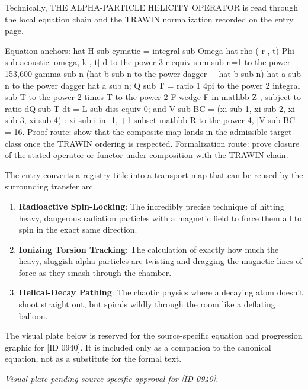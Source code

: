 Technically, THE ALPHA-PARTICLE HELICITY OPERATOR is read through the local equation chain and the TRAWIN normalization recorded on the entry page.

Equation anchors: hat H sub cymatic = integral sub Omega hat rho ( r , t) Phi sub acoustic [omega, k , t] d to the power 3 r equiv sum sub n=1 to the power 153,600 gamma sub n (hat b sub n to the power dagger + hat b sub n) hat a sub n to the power dagger hat a sub n; Q sub T = ratio 1 4pi to the power 2 integral sub T to the power 2 times T to the power 2 F wedge F in mathbb Z , subject to ratio dQ sub T dt = L sub diss equiv 0; and V sub BC = (xi sub 1, xi sub 2, xi sub 3, xi sub 4) : xi sub i in -1, +1 subset mathbb R to the power 4, |V sub BC | = 16. Proof route: show that the composite map lands in the admissible target class once the TRAWIN ordering is respected. Formalization route: prove closure of the stated operator or functor under composition with the TRAWIN chain.

The entry converts a registry title into a transport map that can be reused by the surrounding transfer arc.
\endgroup

\begin{enumerate}[leftmargin=1.6em,itemsep=6pt,topsep=4pt]
\item \textbf{Radioactive Spin-Locking}: The incredibly precise technique of hitting heavy, dangerous radiation particles with a magnetic field to force them all to spin in the exact same direction.
\item \textbf{Ionizing Torsion Tracking}: The calculation of exactly how much the heavy, sluggish alpha particles are twisting and dragging the magnetic lines of force as they smash through the chamber.
\item \textbf{Helical-Decay Pathing}: The chaotic physics where a decaying atom doesn't shoot straight out, but spirals wildly through the room like a deflating balloon.
\end{enumerate}

\begingroup\footnotesize\sloppy
The visual plate below is reserved for the source-specific equation and progression graphic for [ID 0940]. It is included only as a companion to the canonical equation, not as a substitute for the formal text.
\par\endgroup
\begingroup\footnotesize\itshape
Visual plate pending source-specific approval for [ID 0940].
\par\endgroup

